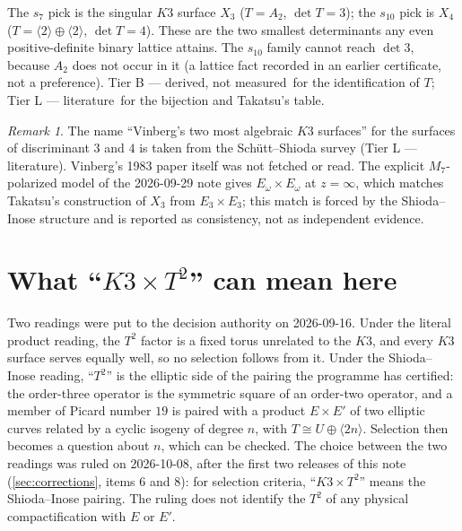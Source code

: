 \documentclass[11pt,a4paper]{article}
\theoremstyle{remark}
\newtheorem{remark}[theorem]{Remark}
\newcommand{\tierB}{\colorbox{yellow!20}{\textsf{\scriptsize Tier B --- derived, not measured}}}
\newcommand{\tierL}{\colorbox{blue!10}{\textsf{\scriptsize Tier L --- literature}}}
\begin{document}
\begin{table}[h]
\centering

\caption{Identification of the $s_7$ points and the $s_{10}$ pick. $^{*}$: the point picked by the adopted
selector. ``classes'': the number of reduced even positive-definite forms of that determinant, computed.
At $z=1/27$ two classes share $\det T=28$, so the determinant alone names no surface there.}\label{tab:id}
\end{table}

\begin{headlinebox}
The $s_7$ pick is the singular $K3$ surface $X_3$ ($T=A_2$, $\det T=3$); the $s_{10}$ pick is $X_4$
($T=\langle2\rangle\oplus\langle2\rangle$, $\det T=4$). These are the two smallest determinants any even
positive-definite binary lattice attains. The $s_{10}$ family cannot reach $\det 3$, because $A_2$ does not
occur in it (a lattice fact recorded in an earlier certificate, not a preference). \tierB\ for the
identification of $T$; \tierL\ for the bijection and Takatsu's table.
\end{headlinebox}

\begin{remark}
The name ``Vinberg's two most algebraic $K3$ surfaces'' for the surfaces of discriminant $3$ and $4$ is
taken from the Sch\"utt--Shioda survey (\tierL). Vinberg's 1983 paper itself was not fetched or read. The
explicit $M_7$-polarized model of the 2026-09-29 note gives $E_\omega\times E_\omega$ at $z=\infty$, which
matches Takatsu's construction of $X_3$ from $E_3\times E_3$; this match is forced by the Shioda--Inose
structure and is reported as consistency, not as independent evidence.
\end{remark}

\section{What ``$K3\times T^2$'' can mean here}\label{sec:k3t2}

Two readings were put to the decision authority on 2026-09-16. Under the literal product reading, the
$T^2$ factor is a fixed torus unrelated to the $K3$, and every $K3$ surface serves equally well, so no
selection follows from it. Under the Shioda--Inose reading, ``$T^2$'' is the elliptic side of the pairing the
programme has certified: the order-three operator is the symmetric square of an order-two operator, and a
member of Picard number $19$ is paired with a product $E\times E'$ of two elliptic curves related by a cyclic
isogeny of degree $n$, with $T\cong U\oplus\langle 2n\rangle$. Selection then becomes a question about $n$,
which can be checked. The choice between the two readings was ruled on 2026-10-08, after the first two
releases of this note (\cref{sec:corrections}, items 6 and 8): for selection criteria, ``$K3\times T^2$''
means the Shioda--Inose pairing. The ruling does not identify the $T^2$ of any physical compactification
with $E$ or $E'$.
\end{document}
